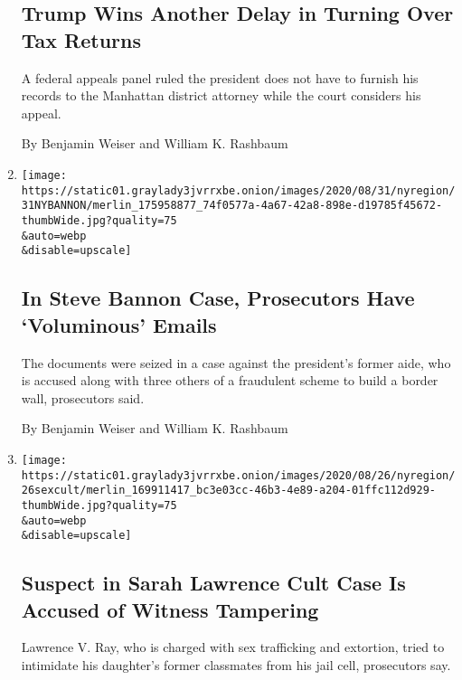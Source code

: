 \begin{enumerate}
  \hypertarget{trump-wins-another-delay-in-turning-over-tax-returns}{%
  \subsection{Trump Wins Another Delay in Turning Over Tax
  Returns}\label{trump-wins-another-delay-in-turning-over-tax-returns}}

  A federal appeals panel ruled the president does not have to furnish
  his records to the Manhattan district attorney while the court
  considers his appeal.

  By Benjamin Weiser and William K. Rashbaum
\item
  \href{/2020/08/31/nyregion/steve-bannon-build-the-wall-fraud.html}{}

  \texttt{[image: https://static01.graylady3jvrrxbe.onion/images/2020/08/31/nyregion/31NYBANNON/merlin\_175958877\_74f0577a-4a67-42a8-898e-d19785f45672-thumbWide.jpg?quality=75\\\&auto=webp\\\&disable=upscale]}

  \hypertarget{in-steve-bannon-case-prosecutors-have-voluminous-emails}{%
  \subsection{In Steve Bannon Case, Prosecutors Have `Voluminous'
  Emails}\label{in-steve-bannon-case-prosecutors-have-voluminous-emails}}

  The documents were seized in a case against the president's former
  aide, who is accused along with three others of a fraudulent scheme to
  build a border wall, prosecutors said.

  By Benjamin Weiser and William K. Rashbaum
\item
  \href{/2020/08/26/nyregion/larry-ray-sarah-lawrence.html}{}

  \texttt{[image: https://static01.graylady3jvrrxbe.onion/images/2020/08/26/nyregion/26sexcult/merlin\_169911417\_bc3e03cc-46b3-4e89-a204-01ffc112d929-thumbWide.jpg?quality=75\\\&auto=webp\\\&disable=upscale]}

  \hypertarget{suspect-in-sarah-lawrence-cult-case-is-accused-of-witness-tampering}{%
  \subsection{Suspect in Sarah Lawrence Cult Case Is Accused of Witness
  Tampering}\label{suspect-in-sarah-lawrence-cult-case-is-accused-of-witness-tampering}}

  Lawrence V. Ray, who is charged with sex trafficking and extortion,
  tried to intimidate his daughter's former classmates from his jail
  cell, prosecutors say.


\end{enumerate}
